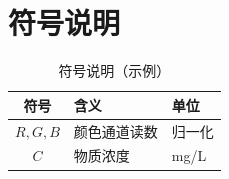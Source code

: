 \section{符号说明}\label{sec:notation}
\begin{table}[H]
    \centering
    \caption{符号说明（示例）}\label{tab:notation}
    \begin{tabular}{cll}
        \toprule
        符号 & 含义 & 单位 \\
        \midrule
        $R,G,B$ & 颜色通道读数 & 归一化 \\
        $C$ & 物质浓度 & mg/L \\
        \bottomrule
    \end{tabular}
\end{table}

